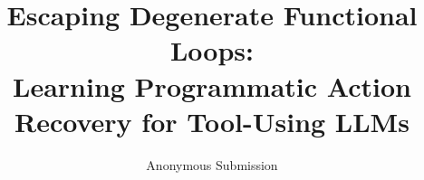 \documentclass[letterpaper]{article}
\title{Escaping Degenerate Functional Loops:\\ Learning Programmatic Action Recovery for Tool-Using LLMs}
\author{Anonymous Submission}
\begin{document}
\maketitle

\begin{abstract}

\end{abstract}





\FloatBarrier





\end{document}
